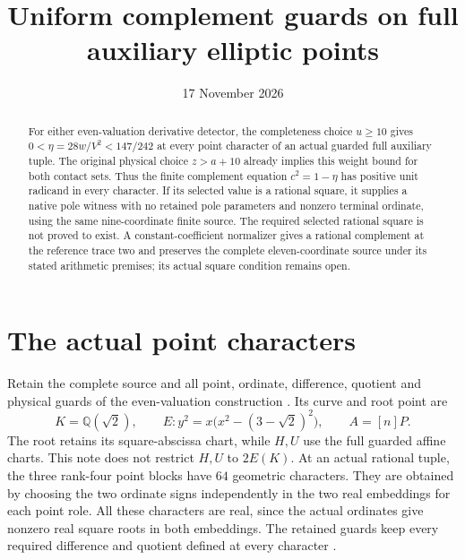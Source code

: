 \documentclass[11pt,a4paper]{article}
\title{Uniform complement guards on full auxiliary elliptic points}
\author{}\date{17 November 2026}
\newcommand{\Q}{\mathbb Q}
\begin{document}
\maketitle
\begin{abstract}
For either even-valuation derivative detector, the completeness choice
$u\ge10$ gives $0<\eta=28w/V^2<147/242$ at every point character
of an actual guarded full auxiliary tuple. The original physical choice
$z>a+10$ already implies this weight bound for both contact sets.
Thus the finite complement equation $c^2=1-\eta$ has positive unit
radicand in every character. If its selected value is a rational square,
it supplies a native pole witness with no retained pole parameters and
nonzero terminal ordinate, using the same nine-coordinate finite source.
The required selected rational square is not proved to exist.
A constant-coefficient normalizer gives a rational complement at the
reference trace two and preserves the complete eleven-coordinate source
under its stated arithmetic premises; its actual square condition remains open.
\end{abstract}

\section{The actual point characters}
Retain the complete source and all point, ordinate, difference, quotient
and physical guards of the even-valuation construction \cite{Even}.
Its curve and root point are
\[
 K=\Q(\sqrt2),\qquad
 E:y^2=x\bigl(x^2-(3-\sqrt2)^2\bigr),\qquad A=[n]P.
\]
The root retains its square-abscissa chart, while $H,U$ use the full
guarded affine charts. This note does not restrict $H,U$ to $2E(K)$.
At an actual rational tuple, the three rank-four point blocks have
$64$ geometric characters. They are obtained by choosing the two
ordinate signs independently in the two real embeddings for each
point role. All these characters are real, since the actual ordinates
give nonzero real square roots in both embeddings. The retained
guards keep every required difference and quotient defined at every
character \cite{Full}.
\end{document}
